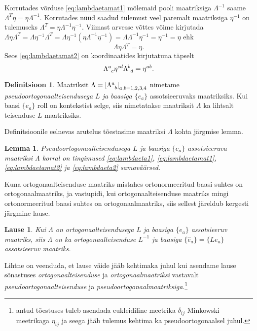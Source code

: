 \documentclass[12pt]{article}
\theoremstyle{plain}
\newtheorem{lemma}{Lemma}[section]
\newtheorem{lause}{Lause}[section]
\theoremstyle{definition}
\newtheorem{definitsioon}{Definitsioon}[section]
\numberwithin{equation}{section}
\begin{document}
Korrutades võrduse \ref{eq:lambdaetamat1} mõlemaid pooli maatriksiga 
$\Lambda^{-1}$ saame $\Lambda^T \eta = \eta \Lambda^{-1}$. Korrutades 
nüüd saadud tulemust veel paremalt maatriksiga $\eta^{-1}$ on 
tulemuseks $\Lambda^T = \eta \Lambda^{-1} \eta^{-1}$. Viimast arvesse 
võttes võime kirjutada $\Lambda \eta \Lambda^T = \Lambda \eta^{-1} 
\Lambda^T = \Lambda \eta^{-1} \left( \eta \Lambda^{-1} \eta^{-1} 
\right) = \Lambda \Lambda^{-1} \eta^{-1} = \eta^{-1} = \eta$ ehk
\begin{equation} \label{eq:lambdaetamat2}
\Lambda \eta \Lambda^T = \eta.
\end{equation}
Seos \ref{eq:lambdaetamat2} on koordinaatides kirjutatuna täpselt
\begin{equation} \label{eq:lambdaeta2}
\Lambda\indices{^a_c} \eta^{cd} \Lambda\indices{^b_d} = \eta^{ab}.
\end{equation}

\begin{definitsioon}
Maatriksit $\Lambda = \left[\Lambda\indices{^a_b} 
\right]_{a,b=1,2,3,4}$ nimetame \emph{pseudoortogonaalteisendusega 
$L$ ja baasiga $\{e_a\}$} assotsieeruvaks maatriksiks. Kui baasi 
$\{e_a\}$ roll on kontekstist selge, siis nimetatakse maatriksit 
$\Lambda$ ka lihtsalt teisenduse $L$ maatriksiks.
\end{definitsioon}

Definitsioonile eelnevas arutelus tõestasime maatriksi $\Lambda$ 
kohta järgmise lemma.
\begin{lemma} \label{lemma:lambdainvariant}
Pseudoortogonaalteisendusega $L$ ja baasiga $\{e_a\}$ assotsieeruva 
maatriksi $\Lambda$ korral on tingimused \ref{eq:lambdaeta1}, 
\ref{eq:lambdaetamat1}, \ref{eq:lambdaetamat2} ja \ref{eq:lambdaeta2} 
samaväärsed.
\end{lemma}

Kuna ortogonaalteisenduse maatriks mistahes ortonormeeritud baasi 
suhtes on ortogonaalmaatriks, ja vastupidi, kui ortogonaalteisenduse 
maatriks mingi ortonormeeritud baasi suhtes on ortogonaalmaatriks, 
siis sellest järeldub kergesti järgmine lause.

\begin{lause}\textnormal{\cite[lk 271]{Kilp}}
Kui $\Lambda$ on ortogonaalteisendusega $L$ ja baasiga $\{e_a\}$ 
assotsieeruv maatriks, siis $\Lambda$ on ka ortogonaalteisenduse 
$L^{-1}$ ja baasiga $\{\hat{e}_a\} = \{Le_a\}$ assotsieeruv maatriks.
\end{lause}

Lihtne on veenduda, et lause väide jääb kehtimaka juhul kui asendame 
lause sõnastuses \emph{ortogonaalteisenduse} ja 
\emph{ortogonaalmaatriksi} vastavalt \emph{pseudoortogonaalteisenduse} 
ja \emph{pseudoortogonaalmaatriksiga}.\footnote{\cite{Kilp} antud 
tõestuses tuleb asendada eukleidiline meetrika $\delta_{ij}$ 
Minkowski meetrikaga $\eta_{ij}$ ja seega jääb tulemus kehtima 
ka pseudoortogonaalsel juhul.}
\end{document}
